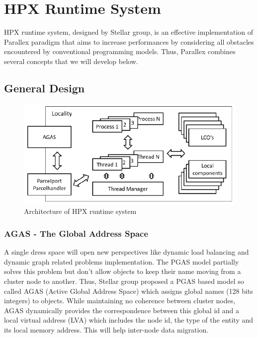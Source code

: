 \documentclass{llncs}
\begin{document}
\section{HPX Runtime System}\label{HPX}
HPX runtime system, designed by Stellar group, is an effective implementation
of Parallex paradigm that aims to increase performances by considering all
obstacles encountered by conventional programming models. Thus, Parallex
combines several concepts that we will develop below.

\subsection{General Design}

\begin{figure}[h]
\begin{center}
\includegraphics[scale=0.55]{Images/Im4.png}
\end{center}
\caption{Architecture of HPX runtime system}
\label{ArchiHPX}
\end{figure}

\subsubsection{AGAS - The Global Address Space}
A single dress space will open new perspectives like dynamic load balancing
and dynamic graph related problems implementation. The PGAS model \cite{PGAS}
partially solves this problem but don't allow objects to keep their name moving
from a cluster node to another. Thus, Stellar group proposed a PGAS based model
so called AGAS (Active Global Address Space) \cite{Parallex} which assigns
global names (128 bits integers) to objects. While maintaining no coherence
between cluster nodes, AGAS dynamically provides the correspondence between
this global id and a local virtual address (LVA) \cite{Parallex} which includes
the node id, the type of the entity and its local memory address. This will
help inter-node data migration.
\end{document}
